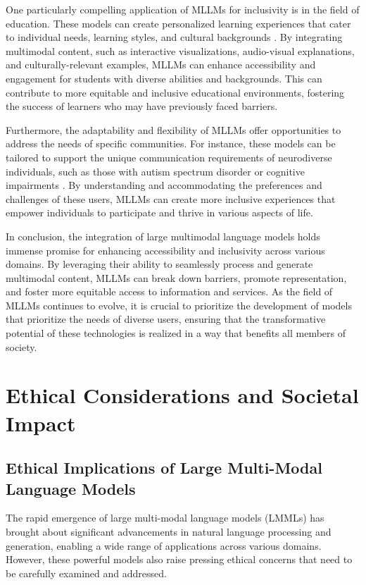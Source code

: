 \documentclass[11pt]{article}
\begin{document}
One particularly compelling application of MLLMs for inclusivity is in the field of education. These models can create personalized learning experiences that cater to individual needs, learning styles, and cultural backgrounds \cite{ref225}. By integrating multimodal content, such as interactive visualizations, audio-visual explanations, and culturally-relevant examples, MLLMs can enhance accessibility and engagement for students with diverse abilities and backgrounds. This can contribute to more equitable and inclusive educational environments, fostering the success of learners who may have previously faced barriers.

Furthermore, the adaptability and flexibility of MLLMs offer opportunities to address the needs of specific communities. For instance, these models can be tailored to support the unique communication requirements of neurodiverse individuals, such as those with autism spectrum disorder or cognitive impairments \cite{ref226}. By understanding and accommodating the preferences and challenges of these users, MLLMs can create more inclusive experiences that empower individuals to participate and thrive in various aspects of life.

In conclusion, the integration of large multimodal language models holds immense promise for enhancing accessibility and inclusivity across various domains. By leveraging their ability to seamlessly process and generate multimodal content, MLLMs can break down barriers, promote representation, and foster more equitable access to information and services. As the field of MLLMs continues to evolve, it is crucial to prioritize the development of models that prioritize the needs of diverse users, ensuring that the transformative potential of these technologies is realized in a way that benefits all members of society.

\section{Ethical Considerations and Societal Impact}

\subsection{Ethical Implications of Large Multi-Modal Language Models}

The rapid emergence of large multi-modal language models (LMMLs) has brought about significant advancements in natural language processing and generation, enabling a wide range of applications across various domains. However, these powerful models also raise pressing ethical concerns that need to be carefully examined and addressed.
\end{document}
